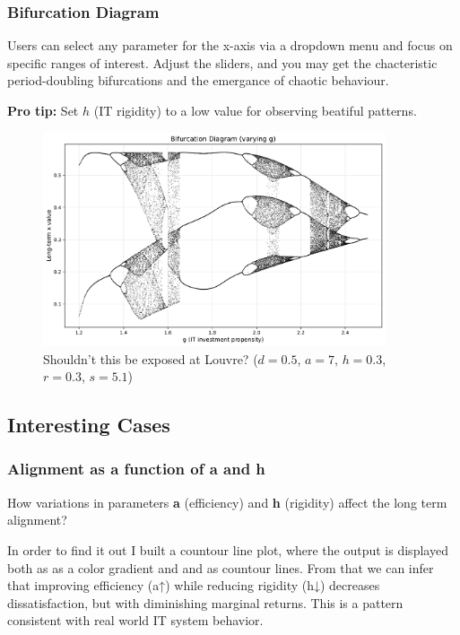 \documentclass[a4paper, 10pt]{article}
\begin{document}
\subsubsection{Bifurcation Diagram}
Users can select any parameter for the x-axis via a dropdown menu and focus on specific ranges of interest.
Adjust the sliders, and you may get the chacteristic period-doubling bifurcations and the emergance of chaotic behaviour.

\textbf{Pro tip:} Set $h$ (IT rigidity) to a low value for observing beatiful patterns.

\begin{figure}[H]
	\centering
	\includegraphics[width=0.9\textwidth]{../images/results/res-int-3.pdf}
	\caption{Shouldn't this be exposed at Louvre? ($d = 0.5$, $a = 7$, $h = 0.3$, $r = 0.3$, $s = 5.1$)}
	\label{fig:bifurcation}
\end{figure}

\clearpage

\subsection{Interesting Cases}

\subsubsection{Alignment as a function of a and h}
How variations in parameters \textbf{a} (efficiency) and \textbf{h} (rigidity) affect the long term alignment?

In order to find it out I built a countour line plot, where the output is displayed both as as a color gradient and and as countour lines.	
From that we can infer that improving efficiency (a↑) while reducing rigidity (h↓) decreases dissatisfaction, but with diminishing marginal returns. 
This is a pattern consistent with real world IT system behavior.
\end{document}
